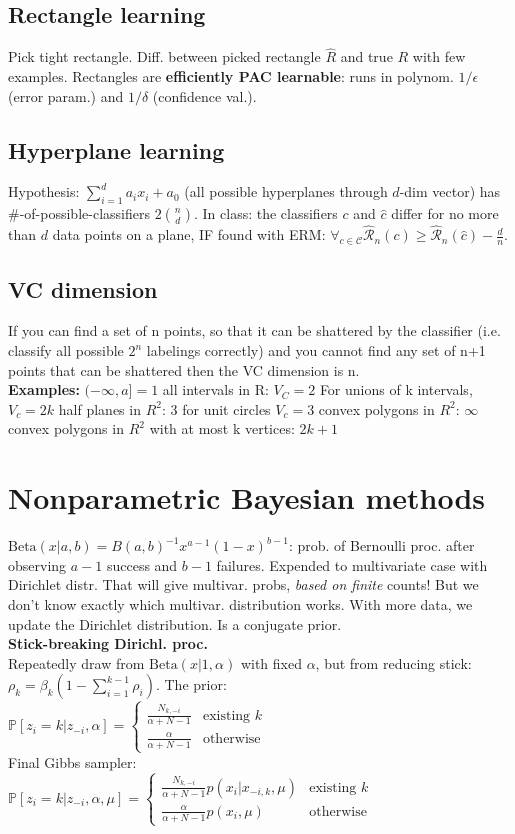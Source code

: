 \subsection*{Rectangle learning}
Pick tight rectangle. Diff. between picked rectangle $\hat{R}$ and true $R$ with few examples. Rectangles are \textbf{efficiently PAC learnable}: runs in polynom. $1/\epsilon$ (error param.) and $1/\delta$ (confidence val.).
\subsection*{Hyperplane learning}
Hypothesis: $\sum_{i=1}^d a_ix_i + a_0$ (all possible hyperplanes through $d$-dim vector) has \#-of-possible-classifiers $2\binom{n}{d}$. In class: the classifiers $c$ and $\hat{c}$ differ for no more than $d$ data points on a plane, IF found with ERM: $\forall_{c\in\mathcal{C}} \hat{\mathcal{R}}_n(c) \geq \hat{\mathcal{R}}_n(\hat{c}) - \frac{d}{n}$.
\subsection*{VC dimension}
If you can find a set of n points, so that it can be shattered by the classifier (i.e. classify all possible $2^n$ labelings correctly) and you cannot find any set of n+1
 points that can be shattered  then the VC dimension is n. \\
 \textbf{Examples:}
$(-\infty, a] =1$ 
all intervals in R: $V_C=2$
For unions of k intervals, $V_c=2k$
half planes in $R^2$: $3$
for unit circles $V_c=3$
convex polygons in $R^2$: $\infty$
convex polygons in $R^2$ with at most k vertices: $2k+1$

\section*{Nonparametric Bayesian methods}
$\text{Beta}(x|a,b)=B(a,b)^{-1} x^{a-1}(1-x)^{b-1}$: prob. of Bernoulli proc. after observing $a-1$ success and $b-1$ failures. Expended to multivariate case with Dirichlet distr. That will give multivar. probs, \textit{based on finite} counts! But we don't know exactly which multivar. distribution works. With more data, we update the Dirichlet distribution. Is a conjugate prior.\\
\textbf{Stick-breaking Dirichl. proc.} \\ Repeatedly draw from $\text{Beta}(x|1,\alpha)$ with fixed $\alpha$, but from reducing stick: $\rho_k=\beta_k(1-\sum_{i=1}^{k-1}\rho_i)$. The prior:\\
$\mathbb{P}[z_i=k|z_{-i},\alpha]=\begin{cases}\frac{N_{k,-i}}{\alpha+N-1} & \text{existing }k \\ \frac{\alpha}{\alpha+N-1} & \text{otherwise}\end{cases}$ \\
Final Gibbs sampler:\\
$\mathbb{P}[z_i=k|z_{-i},\alpha,\mu]=\begin{cases}\frac{N_{k,-i}}{\alpha+N-1}p(x_i|x_{-i,k},\mu) & \text{existing }k \\ \frac{\alpha}{\alpha+N-1}p(x_i,\mu) & \text{otherwise}\end{cases}$

